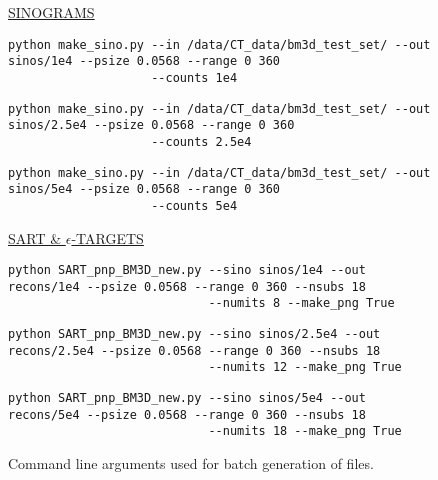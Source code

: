 \documentclass[sigconf,twocolumn,nonacm=true]{acmart}
\newcommand{\eps}{\epsilon} %
\begin{document}
\begin{figure*}[h]
\Huge\caption{Command line arguments used for batch generation of files.}\label{literals}\bigskip
\large\begin{center}\underline{SINOGRAMS}\end{center}\smallskip\normalsize
\begin{verbatim}
python make_sino.py --in /data/CT_data/bm3d_test_set/ --out sinos/1e4 --psize 0.0568 --range 0 360
                    --counts 1e4
\end{verbatim}\smallskip
\begin{verbatim}
python make_sino.py --in /data/CT_data/bm3d_test_set/ --out sinos/2.5e4 --psize 0.0568 --range 0 360
                    --counts 2.5e4
\end{verbatim}\smallskip
\begin{verbatim}
python make_sino.py --in /data/CT_data/bm3d_test_set/ --out sinos/5e4 --psize 0.0568 --range 0 360
                    --counts 5e4
\end{verbatim}\bigskip

\large\begin{center}\underline{SART \& \huge$\eps$\large-TARGETS}\end{center}\smallskip\normalsize
\begin{verbatim}
python SART_pnp_BM3D_new.py --sino sinos/1e4 --out recons/1e4 --psize 0.0568 --range 0 360 --nsubs 18 
                            --numits 8 --make_png True
\end{verbatim}\smallskip
\begin{verbatim}
python SART_pnp_BM3D_new.py --sino sinos/2.5e4 --out recons/2.5e4 --psize 0.0568 --range 0 360 --nsubs 18 
                            --numits 12 --make_png True
\end{verbatim}\smallskip
\begin{verbatim}
python SART_pnp_BM3D_new.py --sino sinos/5e4 --out  recons/5e4 --psize 0.0568 --range 0 360 --nsubs 18 
                            --numits 18 --make_png True
\end{verbatim}\bigskip


\end{figure*}
\end{document}
